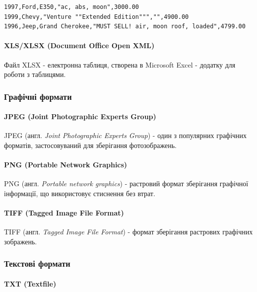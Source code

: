 \begin{verbatim}
1997,Ford,E350,"ac, abs, moon",3000.00  
1999,Chevy,"Venture ""Extended Edition""","",4900.00  
1996,Jeep,Grand Cherokee,"MUST SELL! air, moon roof, loaded",4799.00  
\end{verbatim}

\paragraph{XLS/XLSX (Document Office Open XML)}

Файл XLSX - електронна таблиця, створена в Microsoft Excel - додатку для роботи з таблицями.

\subsubsection{Графічні формати}

\paragraph{JPEG (Joint Photographic Experts Group)}

JPEG (англ. \textit{Joint Photographic Experts Group}) - один з популярних графічних форматів, застосовуваний для зберігання фотозображень.

\paragraph{PNG (Portable Network Graphics)}

PNG (англ. \textit{Portable network graphics}) - растровий формат зберігання графічної інформації, що використовує стиснення без втрат.

\paragraph{TIFF (Tagged Image File Format)}

TIFF (англ. \textit{Tagged Image File Format}) - формат зберігання растрових графічних зображень.

\subsubsection{Текстові формати}

\paragraph{TXT (Textfile)}

